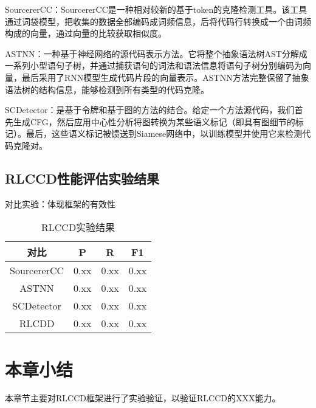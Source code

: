 SourcererCC：SourcererCC是一种相对较新的基于token的克隆检测工具。该工具通过词袋模型，把收集的数据全部编码成词频信息，后将代码行转换成一个由词频构成的向量，通过向量的比较获取相似度。

ASTNN：一种基于神经网络的源代码表示方法。它将整个抽象语法树AST分解成一系列小型语句子树，并通过捕获语句的词法和语法信息将语句子树分别编码为向量，最后采用了RNN模型生成代码片段的向量表示。ASTNN方法完整保留了抽象语法树的结构信息，能够检测到所有类型的代码克隆。

SCDetector：是基于令牌和基于图的方法的结合。给定一个方法源代码，我们首先生成CFG，然后应用中心性分析将图转换为某些语义标记（即具有图细节的标记）。最后，这些语义标记被馈送到Siamese网络中，以训练模型并使用它来检测代码克隆对。

\subsection{RLCCD性能评估实验结果}

对比实验：体现框架的有效性


\begin{table}
  \centering
  \caption{RLCCD实验结果} %
  \begin{tabular*}{0.9\textwidth}{@{\extracolsep{\fill}}cccc}
  \toprule
    对比			&P		&R		&F1 \\
  \midrule
    SourcererCC			&0.xx	&0.xx		&0.xx \\
    ASTNN			&0.xx		&0.xx		&0.xx \\
    SCDetector			&0.xx	&0.xx		&0.xx \\
    RLCDD			&0.xx		&0.xx		&0.xx \\
  \bottomrule
  \end{tabular*}
\end{table}

\section{本章小结}
本章节主要对RLCCD框架进行了实验验证，以验证RLCCD的XXX能力。



